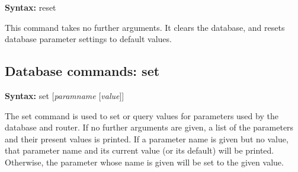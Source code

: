 {\bf Syntax:} {\vt reset}

This command takes no further arguments.  It clears the database, and
resets database parameter settings to default values.

\subsection{Database commands: {\vt set}}

{\bf Syntax:} {\vt set} [{\it paramname} [{\it value\/}]]

The {\vt set} command is used to set or query values for parameters used by the
database and router.  If no further arguments are given, a list of the parameters
and their present values is printed.  If a parameter name is given but
no value, that parameter name and its current value (or its default) will be printed. 
Otherwise, the parameter whose name is given will be set to the given
value.

